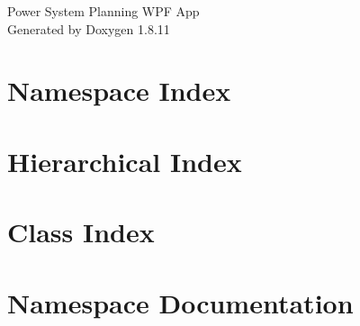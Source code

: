 \documentclass[twoside]{book}
\newcommand{\+}{\discretionary{\mbox{\scriptsize$\hookleftarrow$}}{}{}}
\newcommand{\clearemptydoublepage}{%
  \newpage{\pagestyle{empty}\cleardoublepage}%
}
\begin{document}
\hypersetup{pageanchor=false,
             bookmarksnumbered=true,
             pdfencoding=unicode
            }
\begin{titlepage}
\vspace*{7cm}
\begin{center}%
{\Large Power System Planning W\+PF App }\\
\vspace*{1cm}
{\large Generated by Doxygen 1.8.11}\\
\end{center}
\end{titlepage}
\clearemptydoublepage
\tableofcontents
\clearemptydoublepage
{}
\hypersetup{pageanchor=true}

\chapter{Namespace Index}

\chapter{Hierarchical Index}

\chapter{Class Index}

\chapter{Namespace Documentation}








\end{document}
